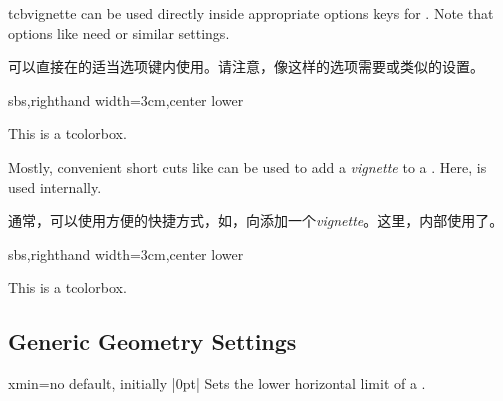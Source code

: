 \begin{docCommand}[doc new=2016-04-22]{tcbvignette}{}
 can be used directly inside appropriate options keys
for . Note that options like  need
 or similar settings.

可以直接在的适当选项键内使用。请注意，像这样的选项需要或类似的设置。

\begin{dispExample*}{sbs,righthand width=3cm,center lower}
\begin{tcolorbox}[enhanced,size=small,sharp corners,
  colback=green!10,colframe=green!50!black,
  boxrule=1mm,titlerule=0mm,
  title=My title,center title,fonttitle=\bfseries,
  underlay={\tcbvignette{size=1mm,inside node=frame,
      raised color=green!50!black}}]
    This is a tcolorbox.
\end{tcolorbox}
\end{dispExample*}

Mostly, convenient short cuts like  can
be used to add a \emph{vignette} to a . Here, 
is used internally.

通常，可以使用方便的快捷方式，如，向添加一个\emph{vignette}。这里，内部使用了。

\begin{dispExample*}{sbs,righthand width=3cm,center lower}
\begin{tcolorbox}[enhanced,size=small,sharp corners,
  colback=green!10,colframe=green!50!black,
  boxrule=1mm,titlerule=0mm,
  title=My title,center title,fonttitle=\bfseries,
  underlay vignette]
    This is a tcolorbox.
\end{tcolorbox}
\end{dispExample*}

\end{docCommand}



\subsection{Generic Geometry Settings}\label{subsec:vignettegeometry}


\begin{vigTcbKey}[][doc new=2016-04-22]{xmin}{=}{no default, initially |0pt|}
  Sets the lower horizontal limit of a .
\end{vigTcbKey}

